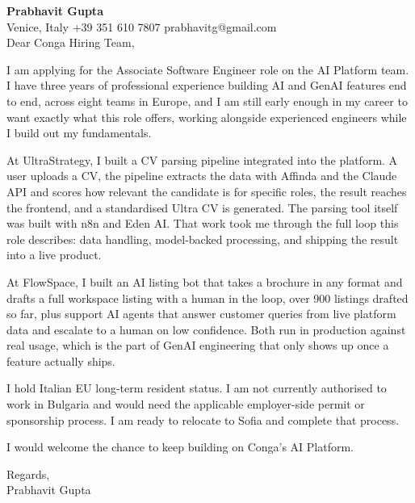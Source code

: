 \documentclass[a4paper,10.5pt]{article}
\begin{document}
\textbf{Prabhavit Gupta}\\
Venice, Italy \textbar{} +39 351 610 7807 \textbar{} prabhavitg@gmail.com\\[10pt]
Dear Conga Hiring Team,

I am applying for the Associate Software Engineer role on the AI Platform team. I have three years of professional experience building AI and GenAI features end to end, across eight teams in Europe, and I am still early enough in my career to want exactly what this role offers, working alongside experienced engineers while I build out my fundamentals.

At UltraStrategy, I built a CV parsing pipeline integrated into the platform. A user uploads a CV, the pipeline extracts the data with Affinda and the Claude API and scores how relevant the candidate is for specific roles, the result reaches the frontend, and a standardised Ultra CV is generated. The parsing tool itself was built with n8n and Eden AI. That work took me through the full loop this role describes: data handling, model-backed processing, and shipping the result into a live product.

At FlowSpace, I built an AI listing bot that takes a brochure in any format and drafts a full workspace listing with a human in the loop, over 900 listings drafted so far, plus support AI agents that answer customer queries from live platform data and escalate to a human on low confidence. Both run in production against real usage, which is the part of GenAI engineering that only shows up once a feature actually ships.

I hold Italian EU long-term resident status. I am not currently authorised to work in Bulgaria and would need the applicable employer-side permit or sponsorship process. I am ready to relocate to Sofia and complete that process.

I would welcome the chance to keep building on Conga's AI Platform.

Regards,\\
Prabhavit Gupta
\end{document}
